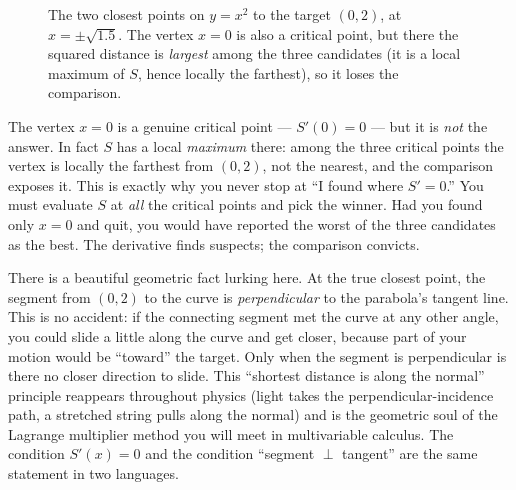 \begin{figure}[H]
\centering
{}
\caption{The two closest points on $y=x^2$ to the target $(0,2)$, at
$x=\pm\sqrt{1.5}$. The vertex $x=0$ is also a critical point, but there the squared
distance is \emph{largest} among the three candidates (it is a local maximum of $S$,
hence locally the farthest), so it loses the comparison.}
\label{ch17:fig-distance}
\end{figure}

\begin{trapbox}
The vertex $x=0$ is a genuine critical point --- $S'(0)=0$ --- but it is \emph{not} the
answer. In fact $S$ has a local \emph{maximum} there: among the three critical points
the vertex is locally the farthest from $(0,2)$, not the nearest, and the comparison
exposes it. This is exactly why you never stop at ``I found where $S'=0$.'' You must
evaluate $S$ at \emph{all} the critical points and pick the winner. Had you found only
$x=0$ and quit, you would have reported the worst of the three candidates as the best.
The derivative finds suspects; the comparison convicts.
\end{trapbox}

\begin{connectionbox}
There is a beautiful geometric fact lurking here. At the true closest point, the
segment from $(0,2)$ to the curve is \emph{perpendicular} to the parabola's tangent
line. This is no accident: if the connecting segment met the curve at any other
angle, you could slide a little along the curve and get closer, because part of your
motion would be ``toward'' the target. Only when the segment is perpendicular is there
no closer direction to slide. This ``shortest distance is along the normal'' principle
reappears throughout physics (light takes the perpendicular-incidence path, a
stretched string pulls along the normal) and is the geometric soul of the Lagrange
multiplier method you will meet in multivariable calculus. The condition $S'(x)=0$ and
the condition ``segment $\perp$ tangent'' are the same statement in two languages.
\end{connectionbox}

